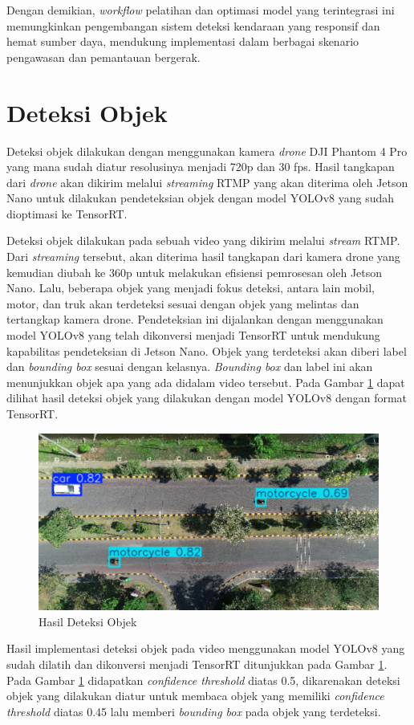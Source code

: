Dengan demikian, \emph{workflow} pelatihan dan optimasi model yang terintegrasi ini memungkinkan pengembangan sistem deteksi kendaraan yang responsif dan hemat sumber daya, mendukung implementasi dalam berbagai skenario pengawasan dan pemantauan bergerak.


\newpage
\section{Deteksi Objek}
Deteksi objek dilakukan dengan menggunakan kamera \emph{drone} DJI Phantom 4 Pro yang mana sudah diatur resolusinya menjadi 720p dan 30 fps. Hasil tangkapan dari \emph{drone} akan dikirim melalui \emph{streaming} RTMP yang akan diterima oleh Jetson Nano untuk dilakukan pendeteksian objek dengan model YOLOv8 yang sudah dioptimasi ke TensorRT.

Deteksi objek dilakukan pada sebuah video yang dikirim melalui \emph{stream} RTMP. Dari \emph{streaming} tersebut, akan diterima hasil tangkapan dari kamera drone yang kemudian diubah ke 360p untuk melakukan efisiensi pemrosesan oleh Jetson Nano. Lalu, beberapa objek yang menjadi fokus deteksi, antara lain mobil, motor, dan truk akan terdeteksi sesuai dengan objek yang melintas dan tertangkap kamera drone. Pendeteksian ini dijalankan dengan menggunakan model YOLOv8 yang telah dikonversi menjadi TensorRT untuk mendukung kapabilitas pendeteksian di Jetson Nano. Objek yang terdeteksi akan diberi label dan \emph{bounding box} sesuai dengan kelasnya. \emph{Bounding box} dan label ini akan menunjukkan objek apa yang ada didalam video tersebut. Pada Gambar \ref{fig:deteksi objek} dapat dilihat hasil deteksi objek yang dilakukan dengan model YOLOv8 dengan format TensorRT.

\begin{figure} [H] \centering
  \includegraphics[scale=0.3]{bab3/deteksiobjek.png}
  \caption{Hasil Deteksi Objek}
  \label{fig:deteksi objek}
\end{figure}
\vspace{-3ex}
Hasil implementasi deteksi objek pada video menggunakan model YOLOv8 yang sudah dilatih dan dikonversi menjadi TensorRT ditunjukkan pada Gambar \ref{fig:deteksi objek}. Pada Gambar \ref{fig:deteksi objek} didapatkan \emph{confidence threshold} diatas 0.5, dikarenakan deteksi objek yang dilakukan diatur untuk membaca objek yang memiliki \emph{confidence threshold} diatas 0.45 lalu memberi \emph{bounding box} pada objek yang terdeteksi.

